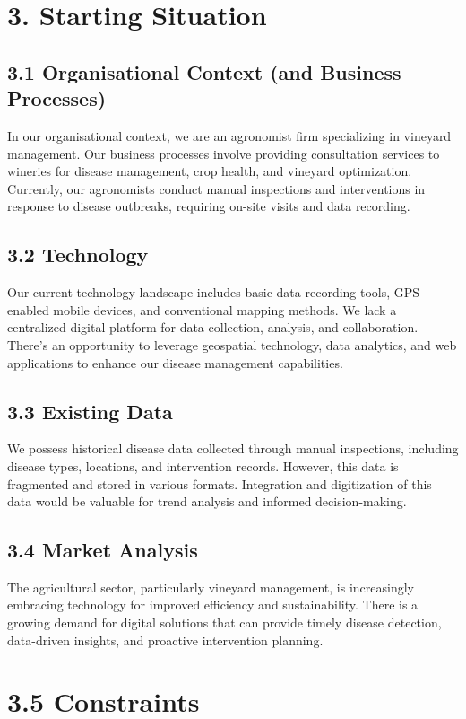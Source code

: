 \section{3. Starting Situation}

\subsection{3.1 Organisational Context (and Business Processes)}
In our organisational context, we are an agronomist firm specializing in vineyard management. Our business processes involve providing consultation services to wineries for disease management, crop health, and vineyard optimization. Currently, our agronomists conduct manual inspections and interventions in response to disease outbreaks, requiring on-site visits and data recording.

\subsection{3.2 Technology}
Our current technology landscape includes basic data recording tools, GPS-enabled mobile devices, and conventional mapping methods. We lack a centralized digital platform for data collection, analysis, and collaboration. There's an opportunity to leverage geospatial technology, data analytics, and web applications to enhance our disease management capabilities.

\subsection{3.3 Existing Data}
We possess historical disease data collected through manual inspections, including disease types, locations, and intervention records. However, this data is fragmented and stored in various formats. Integration and digitization of this data would be valuable for trend analysis and informed decision-making.

\subsection{3.4 Market Analysis}
The agricultural sector, particularly vineyard management, is increasingly embracing technology for improved efficiency and sustainability. There is a growing demand for digital solutions that can provide timely disease detection, data-driven insights, and proactive intervention planning.

\section{3.5 Constraints}

